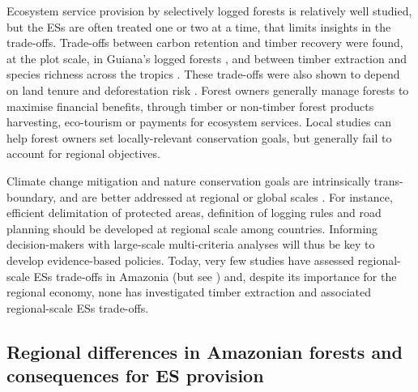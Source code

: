 \documentclass[12pt]{article}
\begin{document}
Ecosystem service provision by selectively logged forests is relatively well studied, but the ESs are often treated one or two at a time, that limits insights in the trade-offs. Trade-offs between carbon retention and timber recovery were found, at the plot scale, in Guiana's logged forests \cite{Roopsind2018}, and between timber extraction and species richness across the tropics \cite{Burivalova2014}. These trade-offs were also shown to depend on land tenure and deforestation risk \cite{Griscom2018}. Forest owners generally manage forests to maximise financial benefits, through timber or non-timber forest products harvesting, eco-tourism or payments for ecosystem services. Local studies can help forest owners set locally-relevant conservation goals, but generally fail to account for regional objectives.

Climate change mitigation and nature conservation goals are intrinsically trans-boundary, and are better addressed at regional or global scales \cite{Hein2006}. For instance, efficient delimitation of protected areas, definition of logging rules and road planning should be developed at regional scale among countries. Informing decision-makers with large-scale multi-criteria analyses will thus be key to develop evidence-based policies. Today, very few studies have assessed regional-scale ESs trade-offs in Amazonia (but see \cite{OConnell2018}) and, despite its importance for the regional economy, none has investigated timber extraction and associated regional-scale ESs trade-offs.

\subsection*{Regional differences in Amazonian forests and consequences for ES provision}
            	
\end{document}
